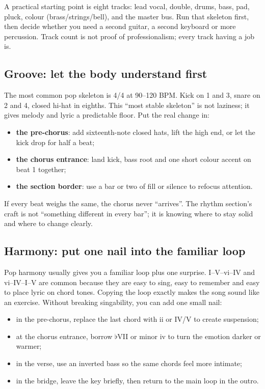 A practical starting point is eight tracks: lead vocal, double, drums, bass, pad, pluck, colour (brass/strings/bell), and the master bus. Run that skeleton first, then decide whether you need a second guitar, a second keyboard or more percussion. Track count is not proof of professionalism; every track having a job is.

\subsection{Groove: let the body understand first}
\label{sec:pop-groove}

The most common pop skeleton is 4/4 at 90--120 BPM. Kick on 1 and 3, snare on 2 and 4, closed hi-hat in eighths. This ``most stable skeleton'' is not laziness; it gives melody and lyric a predictable floor. Put the real change in:

\begin{itemize}
\item \textbf{the pre-chorus}: add sixteenth-note closed hats, lift the high end, or let the kick drop for half a beat;
\item \textbf{the chorus entrance}: land kick, bass root and one short colour accent on beat 1 together;
\item \textbf{the section border}: use a bar or two of fill or silence to refocus attention.
\end{itemize}

If every beat weighs the same, the chorus never ``arrives''. The rhythm section's craft is not ``something different in every bar''; it is knowing where to stay solid and where to change clearly.

\subsection{Harmony: put one nail into the familiar loop}
\label{sec:pop-harmony}

Pop harmony usually gives you a familiar loop plus one surprise. I--V--vi--IV and vi--IV--I--V are common because they are easy to sing, easy to remember and easy to place lyric on chord tones. Copying the loop exactly makes the song sound like an exercise. Without breaking singability, you can add one small nail:

\begin{itemize}
\item in the pre-chorus, replace the last chord with ii or IV/V to create suspension;
\item at the chorus entrance, borrow $\flat$VII or minor iv to turn the emotion darker or warmer;
\item in the verse, use an inverted bass so the same chords feel more intimate;
\item in the bridge, leave the key briefly, then return to the main loop in the outro.
\end{itemize}

